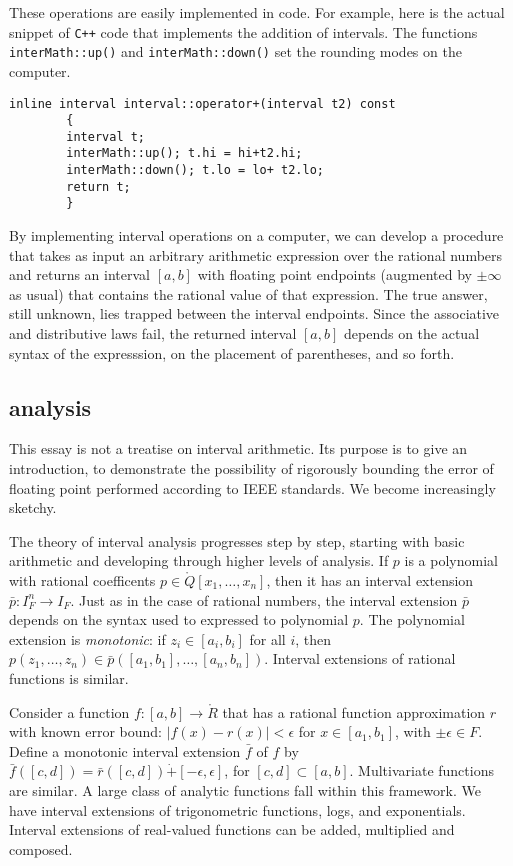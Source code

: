 These operations are easily implemented in code.  For example, here is the actual snippet of 
{\tt C++} code that implements the addition of intervals.  The functions
{\tt interMath::up()} and {\tt interMath::down()} set the rounding modes on the 
computer.  
\begin{verbatim}
inline interval interval::operator+(interval t2) const
        {
        interval t;
        interMath::up(); t.hi = hi+t2.hi;
        interMath::down(); t.lo = lo+ t2.lo;
        return t;
        }
\end{verbatim}

By implementing interval operations on a computer, we can develop a procedure that
takes as input 
an arbitrary arithmetic expression over the rational numbers and returns an
interval $[a,b]$ with floating point endpoints (augmented by $\pm\infty$ as usual)
that contains the rational value of that expression.
The true answer, still unknown, lies trapped between the interval endpoints.
Since the associative and distributive laws fail, the returned interval
 $[a,b]$ depends on the actual syntax of the expresssion, on  the placement of parentheses,
and so forth.



\subsection{analysis}

This essay is not a treatise on interval arithmetic.  Its purpose
is to give an introduction, to demonstrate the possibility of rigorously
bounding the error of floating point performed according to IEEE standards.
We become increasingly sketchy.

The theory of interval analysis progresses step by step, starting with
basic arithmetic and developing through higher levels of analysis.
If $p$ is a polynomial with rational coefficents $p\in\ring{Q}[x_1,\ldots,x_n]$, then it has an interval
extension $\bar p : I_F^n \to I_F$.  Just as in the case of rational
numbers, the interval extension $\bar p$ depends on the syntax used to
expressed to polynomial $p$.    The polynomial extension is {\it monotonic}:
  if $z_i\in [a_i,b_i]$ for all $i$, then
$p(z_1,\ldots,z_n) \in \bar p([a_1,b_1],\ldots,[a_n,b_n])$.
Interval extensions of rational functions is similar.

Consider a function $f:[a,b]\to\ring{R}$ that
has a rational function approximation $r$ with known
error bound:  $|f(x) - r(x)|<\epsilon$ for $x\in[a_1,b_1]$,
with $\pm\epsilon\in F$.
Define a monotonic interval extension $\bar f$ of $f$ by
$\bar f([c,d]) = \bar r([c,d]) \dot + [-\epsilon,\epsilon]$, for
$[c,d]\subset [a,b]$.  
Multivariate functions are similar.   
%
A large class of analytic functions fall within this framework.
We have interval extensions of trigonometric functions, logs, and
exponentials.  Interval extensions of real-valued functions can be
added, multiplied and composed.  

